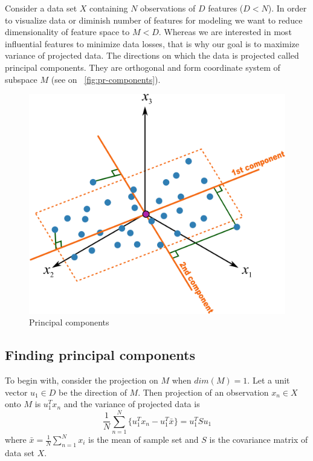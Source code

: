 Consider a data set $X$ containing $N$ observations of $D$ features ($D<N$). In order to visualize data or diminish number of features for modeling we want to reduce dimensionality of feature space to $M<D$. Whereas we are interested in most influential features to minimize data losses, that is why our goal is to maximize variance of projected data. The directions on which the data is projected called principal components. They are orthogonal and form coordinate system of subspace $M$ (see on ~\autoref{fig:pr-components}).

\begin{figure}[h]
	\centering
	\includegraphics[scale=0.3]{img/geometric-PCA-8-both-components-with-plane.png}
	\caption{\label{fig:pr-components}Principal components}
\end{figure}

\subsection{Finding principal components}
To begin with, consider the projection on $M$ when $dim(M)=1$. Let a unit vector $u_1 \in D$ be the direction of $M$. Then projection of an observation $x_n\in X$ onto $M$ is $u_1^Tx_n$ and the variance of projected data is
\begin{equation}\label{var_proj}
 \dfrac{1}{N}\sum_{n=1}^{N}{\{u_1^T x_n - u_1^T \bar{x}\}}=u_1^T S u_1
\end{equation}	 
where $\bar{x} = \frac{1}{N}\sum_{n=1}^{N} x_i$ is the mean of sample set and $S$ is the covariance matrix of data set $X$.

